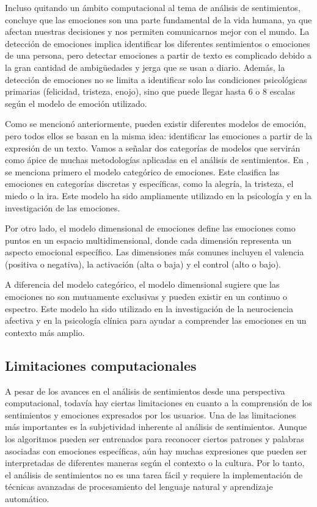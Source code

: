 \documentclass[conference]{IEEEtran}
\begin{document}
Incluso quitando un ámbito computacional al tema de análisis de sentimientos, \cite{b2} concluye que las emociones son una parte fundamental de la vida humana, ya que afectan nuestras decisiones y nos permiten comunicarnos mejor con el mundo. 
La detección de emociones implica identificar los diferentes sentimientos o emociones de una persona, pero detectar emociones a partir de texto es complicado debido a la gran cantidad de ambigüedades y jerga que se usan a diario. 
Además, la detección de emociones no se limita a identificar solo las condiciones psicológicas primarias (felicidad, tristeza, enojo), sino que puede llegar hasta 6 o 8 escalas según el modelo de emoción utilizado.

Como se mencionó anteriormente, pueden existir diferentes modelos de emoción, pero todos ellos se basan en la misma idea: identificar las emociones a partir de la expresión de un texto. Vamos a señalar dos categorías de modelos que servirán como ápice de muchas metodologías aplicadas en el análisis de sentimientos. En \cite{b3}, se menciona primero el modelo categórico de emociones. Este clasifica las emociones en categorías discretas y específicas, como la alegría, la tristeza, el miedo o la ira. Este modelo ha sido ampliamente utilizado en la psicología y en la investigación de las emociones.

Por otro lado, el modelo dimensional de emociones define las emociones como puntos en un espacio multidimensional, donde cada dimensión representa un aspecto emocional específico. Las dimensiones más comunes incluyen el valencia (positiva o negativa), la activación (alta o baja) y el control (alto o bajo).

A diferencia del modelo categórico, el modelo dimensional sugiere que las emociones no son mutuamente exclusivas y pueden existir en un continuo o espectro. Este modelo ha sido utilizado en la investigación de la neurociencia afectiva y en la psicología clínica para ayudar a comprender las emociones en un contexto más amplio.

\subsection{Limitaciones computacionales}
A pesar de los avances en el análisis de sentimientos desde una perspectiva computacional, todavía hay ciertas limitaciones en cuanto a la comprensión de los sentimientos y emociones expresados por los usuarios. 
Una de las limitaciones más importantes es la subjetividad inherente al análisis de sentimientos. 
Aunque los algoritmos pueden ser entrenados para reconocer ciertos patrones y palabras asociadas con emociones específicas, aún hay muchas expresiones que pueden ser interpretadas de diferentes maneras según el contexto o la cultura. 
Por lo tanto, el análisis de sentimientos no es una tarea fácil y requiere la implementación de técnicas avanzadas de procesamiento del lenguaje natural y aprendizaje automático.
\end{document}
